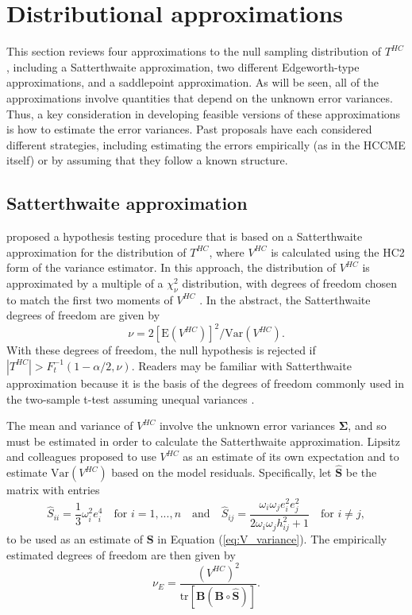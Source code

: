 \documentclass[12pt]{article}\usepackage[]{graphicx}\usepackage[]{color}
\newcommand{\E}{\text{E}}
\newcommand{\Var}{\text{Var}}
\newcommand{\tr}{\text{tr}}
\newcommand{\bm}{\mathbf}
\newcommand{\bs}{\boldsymbol}
\begin{document}
\section{Distributional approximations}
\label{sec:approximations}

This section reviews four approximations to the null sampling distribution of $T^{HC}$, including a Satterthwaite approximation, two different Edgeworth-type approximations, and a saddlepoint approximation. 
As will be seen, all of the approximations involve quantities that depend on the unknown error variances. 
Thus, a key consideration in developing feasible versions of these approximations is how to estimate the error variances. 
Past proposals have each considered different strategies, including estimating the errors empirically (as in the HCCME itself) or by assuming that they follow a known structure. 

\subsection{Satterthwaite approximation} 

\citet{Lipsitz1999degrees} proposed a hypothesis testing procedure that is based on a Satterthwaite approximation for the distribution of $T^{HC}$, where $V^{HC}$ is calculated using the HC2 form of the variance estimator. 
In this approach, the distribution of $V^{HC}$ is approximated by a multiple of a $\chi^2_\nu$ distribution, with degrees of freedom chosen to match the first two moments of $V^{HC}$ \citep{Satterthwaite1946approximate}. 
In the abstract, the Satterthwaite degrees of freedom are given by 
\[
\nu = 2 \left[\E\left(V^{HC}\right)\right]^2 / \Var\left(V^{HC}\right).
\]
With these degrees of freedom, the null hypothesis is rejected if $|T^{HC}| > F_t^{-1}\left(1 - \alpha / 2, \nu\right)$. 
Readers may be familiar with Satterthwaite approximation because it is the basis of the degrees of freedom commonly used in the two-sample t-test assuming unequal variances \citep{Welch1947generalization}. 

The mean and variance of $V^{HC}$ involve the unknown error variances $\bs\Sigma$, and so  must be estimated in order to calculate the Satterthwaite approximation. 
Lipsitz and colleagues proposed to use $V^{HC}$ as an estimate of its own expectation and to estimate $\Var\left(V^{HC}\right)$ based on the model residuals. 
Specifically, let $\bm{\hat{S}}$ be the matrix with entries \[
\hat{S}_{ii} = \frac{1}{3}\omega_i^2 e_i^4 \quad \text{for } i = 1,...,n \quad \text{and} \quad \hat{S}_{ij} = \frac{\omega_i \omega_j e_i^2 e_j^2}{2\omega_i \omega_j h_{ij}^2 + 1} \quad \text{for } i \neq j, \]
to be used as an estimate of $\bm{S}$ in Equation (\ref{eq:V_variance}).
The empirically estimated degrees of freedom are then given by
\begin{equation}
\label{eq:nu_empirical}
\nu_E = \frac{\left(V^{HC}\right)^2}{\tr\left[\bm{B} \left(\bm{B} \circ \bm{\hat{S}}\right)\right]}.
\end{equation}
\end{document}
